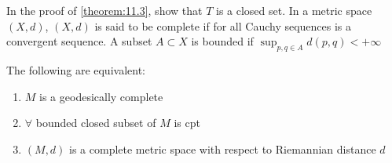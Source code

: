 \begin{problem}
    In the proof of \autoref{theorem:11.3}, show that $T$ is a closed set.
    In a metric space $(X,d)$, $(X,d)$ is said to be complete if for all Cauchy sequences is a convergent sequence.
    A subset $A \subset X$ is bounded if $\sup_{p,q \in A} d(p,q) < + \infty$
\end{problem}

\begin{theorem}\label{theorem:11.4}
    The following are equivalent:
    \begin{enumerate}[label=(\roman*), ref=Theorem \thetheorem~(\roman*)]
        \item \label{thm:11.4.1} $M$ is a geodesically complete
        \item \label{thm:11.4.2} $\forall$ bounded closed subset of $M$ is cpt
        \item \label{thm:11.4.3} $(M,d)$ is a complete metric space with respect to Riemannian distance $d$
    \end{enumerate}
\end{theorem}

